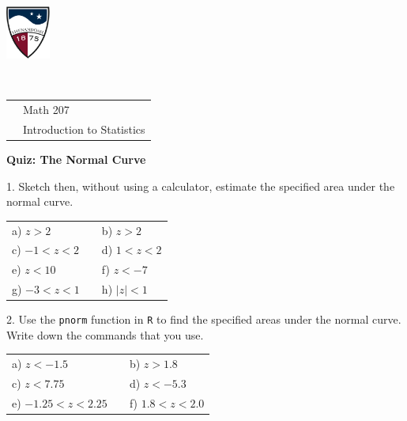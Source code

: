 \documentclass[10pt]{article}
\begin{document}
\pagestyle{empty}
\lstset{language=R, showspaces=false, showstringspaces=false}

\href{http://www.su.edu}{\includegraphics[height=1.75cm]{sulogo.eps}}
\vspace{-1.69cm}

{{\ }\hfill\small
\begin{tabular}{cl}
& Math 207\\
& Introduction to Statistics\\
\end{tabular}
}
\setlength{\baselineskip}{1.05\baselineskip}

\begin{center}
\textbf{\large  Quiz:  The Normal Curve}
\end{center}
\newcommand{\Z}{\hphantom{0}}

1. Sketch then, without using a calculator, estimate the specified area under the normal curve.

\begin{center}
\begin{tabular}{lcl}
a) $z>2$ & \hspace{3in} & b) $z>2$\\[1in]
c) $-1<z<2$ &           & d) $1<z<2$\\[1in]
e) $z<10$   &           & f) $z<-7$\hphantom{\hspace{1in}}\\[1in]
g) $-3<z<1$ &           & h) $|z|<1$\\[1in]
\end{tabular}
\end{center}

2. Use the \texttt{pnorm} function in \texttt{R} to find the specified areas under the normal curve.
Write down the commands that you use.
\begin{center}
\begin{tabular}{lcl}
a) $z<-1.5$ & \hspace{3in} & b) $z>1.8$\\[.7in]
c) $z<7.75$   &           & d) $z<-5.3$\hphantom{\hspace{1in}}\\[.7in]
e) $-1.25<z<2.25$ &           & f) $1.8<z<2.0$\\[.7in]
\end{tabular}
\end{center}
\end{document}
